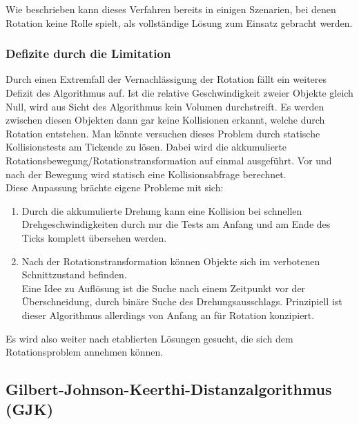 Wie beschrieben kann dieses Verfahren bereits in einigen Szenarien, bei denen Rotation keine Rolle spielt, als vollständige Lösung zum Einsatz gebracht werden.\\

\subsubsection{Defizite durch die Limitation}
Durch einen Extremfall der Vernachlässigung der Rotation fällt ein weiteres Defizit des Algorithmus auf. Ist die relative Geschwindigkeit zweier Objekte gleich Null, wird aus Sicht des Algorithmus kein Volumen durchstreift. Es werden zwischen diesen Objekten dann gar keine Kollisionen erkannt, welche durch Rotation entstehen.
Man könnte versuchen dieses Problem durch statische Kollisionstests am Tickende zu lösen. Dabei wird die akkumulierte Rotationsbewegung/Rotationstransformation auf einmal ausgeführt. Vor und nach der Bewegung wird statisch eine Kollisionsabfrage berechnet.\\
Diese Anpassung brächte eigene Probleme mit sich:
\begin{enumerate}
\item Durch die akkumulierte Drehung kann eine Kollision bei schnellen Drehgeschwindigkeiten durch nur die Tests am Anfang und am Ende des Ticks komplett übersehen werden.
\item Nach der Rotationstransformation können Objekte sich im verbotenen Schnittzustand befinden.\\
Eine Idee zu Auflösung ist die Suche nach einem Zeitpunkt vor der Überschneidung, durch binäre Suche \cite[ch.6.1, p.131]{fourcrossfour} des Drehungsausschlags. Prinzipiell ist dieser Algorithmus allerdings von Anfang an für Rotation konzipiert.
\end{enumerate}

Es wird also weiter nach etablierten Lösungen gesucht, die sich dem Rotationsproblem annehmen können.

\subsection{Gilbert-Johnson-Keerthi-Distanzalgorithmus (GJK)}
\label{sec:gjk}

